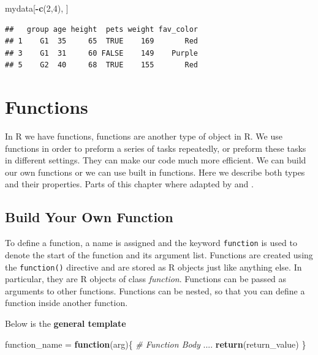 \documentclass[
]{book}
\newenvironment{Shaded}{\begin{snugshade}}{\end{snugshade}}
\newcommand{\CommentTok}[1]{\textcolor[rgb]{0.56,0.35,0.01}{\textit{#1}}}
\newcommand{\ControlFlowTok}[1]{\textcolor[rgb]{0.13,0.29,0.53}{\textbf{#1}}}
\newcommand{\DecValTok}[1]{\textcolor[rgb]{0.00,0.00,0.81}{#1}}
\newcommand{\KeywordTok}[1]{\textcolor[rgb]{0.13,0.29,0.53}{\textbf{#1}}}
\newcommand{\NormalTok}[1]{#1}
\newcommand{\OperatorTok}[1]{\textcolor[rgb]{0.81,0.36,0.00}{\textbf{#1}}}
\newcommand{\StringTok}[1]{\textcolor[rgb]{0.31,0.60,0.02}{#1}}
\begin{document}
\begin{Shaded}
\begin{Highlighting}[]
\NormalTok{mydata[}\OperatorTok{-}\KeywordTok{c}\NormalTok{(}\DecValTok{2}\NormalTok{,}\DecValTok{4}\NormalTok{), ]}
\end{Highlighting}
\end{Shaded}

\begin{verbatim}
##   group age height  pets weight fav_color
## 1    G1  35     65  TRUE    169       Red
## 3    G1  31     60 FALSE    149    Purple
## 5    G2  40     68  TRUE    155       Red
\end{verbatim}

\hypertarget{functions}{%
\chapter{Functions}\label{functions}}

In R we have functions, functions are another type of object in R. We use functions in order to preform a series of tasks repeatedly, or preform these tasks in different settings. They can make our code much more efficient. We can build our own functions or we can use built in functions. Here we describe both types and their properties. Parts of this chapter where adapted by \citet{r-func} and \citet{dummies2015}.

\hypertarget{build-your-own-function}{%
\section{Build Your Own Function}\label{build-your-own-function}}

To define a function, a name is assigned and the keyword \texttt{function} is used to denote the start of the function and its argument list. Functions are created using the \texttt{function()} directive and are stored as R objects just like anything else. In particular, they are R objects of class \emph{function}. Functions can be passed as arguments to other functions. Functions can be nested, so that you can define a function inside another function.

Below is the \textbf{general template}

\begin{Shaded}
\begin{Highlighting}[]
\NormalTok{function_name =}\StringTok{ }\ControlFlowTok{function}\NormalTok{(arg)\{}
  \CommentTok{# Function Body }
\NormalTok{  ....}
  \KeywordTok{return}\NormalTok{(return_value)}
\NormalTok{\}}
\end{Highlighting}
\end{Shaded}
\end{document}
